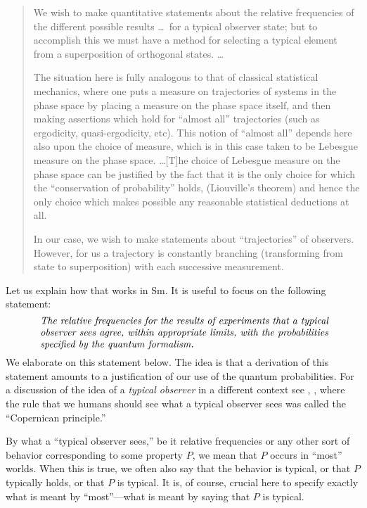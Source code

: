 \documentclass[12pt]{article}
\begin{document}
\begin{quote}
We wish to make quantitative statements about the relative frequencies
of the different possible results \ldots\ for a typical observer state;
but to accomplish this we must have a method for selecting a typical
element from a superposition of orthogonal states. \ldots

The situation here is fully analogous to that of classical statistical 
mechanics, where one puts a measure on trajectories of systems in the 
phase space by placing a measure on the phase space itself, and then 
making assertions which hold for ``almost all'' trajectories (such as 
ergodicity, quasi-ergodicity, etc).  This notion of ``almost all'' depends 
here also upon the choice of measure, which is in this case taken to be 
Lebesgue measure on the phase space. \ldots  [T]he choice of Lebesgue measure on the phase space can be justified by the fact that it is the only choice for which the ``conservation of probability'' holds, (Liouville's theorem) and hence the only choice which makes possible any reasonable statistical deductions at all. 
 
In our case, we wish to make statements about ``trajectories'' of observers. However, for us a trajectory is constantly branching (transforming from state to superposition) with each successive measurement.
\end{quote}

Let us explain how that works in Sm. It is useful to focus on the following statement: 
\begin{equation}
\mbox{
\begin{minipage}{0.85\textwidth}
\textit{The relative frequencies for the results of experiments that a typical observer sees agree, within appropriate limits, with the probabilities specified by the quantum formalism.}
\end{minipage}}
\label{stat:one}
\end{equation}
We elaborate on this statement below. The idea is that a derivation of this statement amounts to a justification of our use of the quantum probabilities. For a discussion of the idea of a \emph{typical observer} in a different context see \cite{Gott93}, \cite[Chap.~5]{Gott01}, where the rule that we humans should see what a typical observer sees was called the ``Copernican principle.''

By what a ``typical observer sees,'' be it relative frequencies or any other sort of behavior corresponding to some property $P$, we mean that $P$ occurs in ``most'' worlds. When this is true, we often also say that the behavior is typical, or that $P$ typically holds, or that $P$ is typical. It is, of course, crucial here to specify exactly what is meant by ``most''---what is meant by saying that $P$ is typical.
\end{document}

